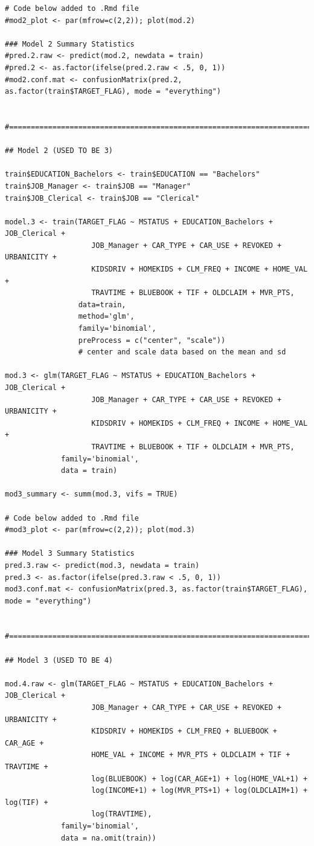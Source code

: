 \documentclass[]{article}
\begin{document}
\begin{verbatim}
# Code below added to .Rmd file
#mod2_plot <- par(mfrow=c(2,2)); plot(mod.2)

### Model 2 Summary Statistics
#pred.2.raw <- predict(mod.2, newdata = train)
#pred.2 <- as.factor(ifelse(pred.2.raw < .5, 0, 1))
#mod2.conf.mat <- confusionMatrix(pred.2, as.factor(train$TARGET_FLAG), mode = "everything")


#==============================================================================#

## Model 2 (USED TO BE 3)

train$EDUCATION_Bachelors <- train$EDUCATION == "Bachelors"
train$JOB_Manager <- train$JOB == "Manager"
train$JOB_Clerical <- train$JOB == "Clerical"

model.3 <- train(TARGET_FLAG ~ MSTATUS + EDUCATION_Bachelors + JOB_Clerical + 
                    JOB_Manager + CAR_TYPE + CAR_USE + REVOKED + URBANICITY + 
                    KIDSDRIV + HOMEKIDS + CLM_FREQ + INCOME + HOME_VAL + 
                    TRAVTIME + BLUEBOOK + TIF + OLDCLAIM + MVR_PTS,
                 data=train,
                 method='glm',
                 family='binomial',
                 preProcess = c("center", "scale")) 
                 # center and scale data based on the mean and sd

mod.3 <- glm(TARGET_FLAG ~ MSTATUS + EDUCATION_Bachelors + JOB_Clerical + 
                    JOB_Manager + CAR_TYPE + CAR_USE + REVOKED + URBANICITY + 
                    KIDSDRIV + HOMEKIDS + CLM_FREQ + INCOME + HOME_VAL + 
                    TRAVTIME + BLUEBOOK + TIF + OLDCLAIM + MVR_PTS,
             family='binomial',
             data = train)

mod3_summary <- summ(mod.3, vifs = TRUE)

# Code below added to .Rmd file
#mod3_plot <- par(mfrow=c(2,2)); plot(mod.3)

### Model 3 Summary Statistics
pred.3.raw <- predict(mod.3, newdata = train)
pred.3 <- as.factor(ifelse(pred.3.raw < .5, 0, 1))
mod3.conf.mat <- confusionMatrix(pred.3, as.factor(train$TARGET_FLAG), mode = "everything")


#==============================================================================#

## Model 3 (USED TO BE 4)

mod.4.raw <- glm(TARGET_FLAG ~ MSTATUS + EDUCATION_Bachelors + JOB_Clerical + 
                    JOB_Manager + CAR_TYPE + CAR_USE + REVOKED + URBANICITY + 
                    KIDSDRIV + HOMEKIDS + CLM_FREQ + BLUEBOOK + CAR_AGE + 
                    HOME_VAL + INCOME + MVR_PTS + OLDCLAIM + TIF + TRAVTIME +
                    log(BLUEBOOK) + log(CAR_AGE+1) + log(HOME_VAL+1) + 
                    log(INCOME+1) + log(MVR_PTS+1) + log(OLDCLAIM+1) + log(TIF) + 
                    log(TRAVTIME),
             family='binomial',
             data = na.omit(train))


\end{verbatim}
\end{document}
